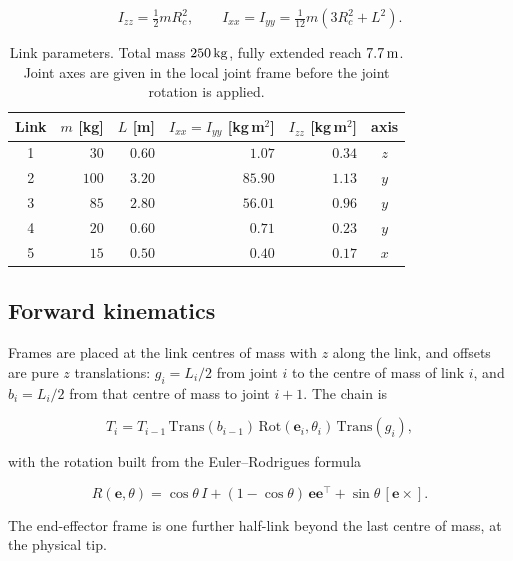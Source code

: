 \begin{equation}
I_{zz} = \tfrac12 m R_c^2, \qquad
I_{xx} = I_{yy} = \tfrac{1}{12} m\left(3R_c^2 + L^2\right).
\label{eq:inertia}
\end{equation}

\begin{table}[htbp]
\centering
\caption{Link parameters. Total mass $250\,\mathrm{kg}$, fully extended reach
$7.7\,\mathrm{m}$. Joint axes are given in the local joint frame before the
joint rotation is applied.}
\label{tab:links}
\small
\begin{tabular}{crrrrc}
\toprule
Link & $m$ [kg] & $L$ [m] & $I_{xx}=I_{yy}$ [kg\,m$^2$] & $I_{zz}$ [kg\,m$^2$] & axis \\
\midrule
1 & $30$  & $0.60$ & $1.07$  & $0.34$ & $z$ \\
2 & $100$ & $3.20$ & $85.90$ & $1.13$ & $y$ \\
3 & $85$  & $2.80$ & $56.01$ & $0.96$ & $y$ \\
4 & $20$  & $0.60$ & $0.71$  & $0.23$ & $y$ \\
5 & $15$  & $0.50$ & $0.40$  & $0.17$ & $x$ \\
\bottomrule
\end{tabular}
\end{table}

\subsection{Forward kinematics}

Frames are placed at the link centres of mass with $z$ along the link, and
offsets are pure $z$ translations: $g_i = L_i/2$ from joint $i$ to the centre of
mass of link $i$, and $b_i = L_i/2$ from that centre of mass to joint $i+1$. The
chain is

\begin{equation}
T_i = T_{i-1}\, \mathrm{Trans}(b_{i-1})\, \mathrm{Rot}(\mathbf e_i, \theta_i)\, \mathrm{Trans}(g_i),
\label{eq:chain}
\end{equation}

with the rotation built from the Euler--Rodrigues formula

\begin{equation}
R(\mathbf e, \theta) = \cos\theta\, I + (1-\cos\theta)\,\mathbf e\mathbf e^\top + \sin\theta\,[\mathbf e\times].
\label{eq:rodrigues}
\end{equation}

The end-effector frame is one further half-link beyond the last centre of mass,
at the physical tip.


